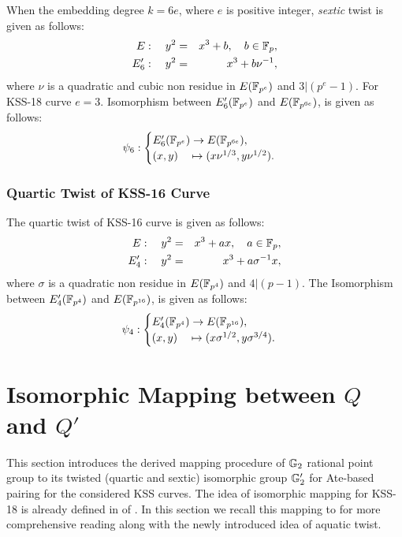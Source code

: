 When the embedding degree $k = 6e$, where $e$ is positive integer, \textit{sextic} twist  is given as follows:
\begin{eqnarray}
E:  \quad y^2 & = & x^3+b, \quad b \in {\mathbb{F}}_{p}, \\
E'_6: \quad y^2 & =  & x^3+b\nu^{-1},
\end{eqnarray}  
where $\nu$ is a quadratic and cubic non residue in $E({\mathbb{F}}_{p^{e}})$ and $3|(p^e-1)$.  For KSS-18 curve $e=3$. Isomorphism between $E'_6({\mathbb{F}}_{p^{e}})$ and $E({\mathbb{F}}_{p^{6e}})$, is given as follows:
\begin{eqnarray}
\psi_6 : \begin{cases}
E'_6({\mathbb{F}}_{p^{e}}) \rightarrow E({\mathbb{F}}_{p^{6e}}),\\
(x,y) \quad \mapsto (x\nu^{1/3},y\nu^{1/2}).
\end{cases}
\end{eqnarray}


\subsubsection{Quartic Twist of KSS-16 Curve}
\label{sec:ch:ijnc:kss16twist}
The quartic twist of KSS-16 curve is given as  follows:
\begin{eqnarray}
E:  \quad y^2 & = & x^3+ax, \quad a \in {\mathbb{F}}_{p}, \\
E'_4: \quad y^2 & =  & x^3+a\sigma^{-1}x,
\end{eqnarray}  
where $\sigma$ is a quadratic non residue in $E({\mathbb{F}}_{p^{4}})$ and $4|(p-1)$.  The Isomorphism between $E'_4({\mathbb{F}}_{p^{4}})$ and $E({\mathbb{F}}_{p^{16}})$, is given as follows:
\begin{eqnarray}
\psi_4 : \begin{cases}
E'_4({\mathbb{F}}_{p^{4}}) \rightarrow E({\mathbb{F}}_{p^{16}}),\\
(x,y) \quad \mapsto (x\sigma^{1/2},y\sigma^{3/4}).
\end{cases}
\end{eqnarray}

\section{Isomorphic Mapping between \texorpdfstring{$Q$}{Q} and \texorpdfstring{$Q'$}{Q'}}
This section introduces the derived mapping procedure of ${\mathbb{G}}_{2}$ rational point group to its twisted (quartic and  sextic) isomorphic group ${\mathbb{G}}_{2}'$ for Ate-based pairing for the considered KSS curves. 
The idea of isomorphic mapping for KSS-18  is already defined in   of . 
In this section we recall this mapping to for more comprehensive reading along with the newly introduced idea of aquatic twist.

